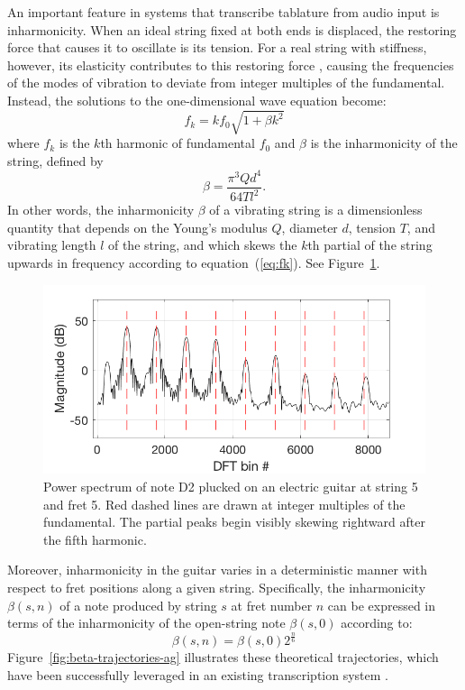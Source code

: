 \documentclass[convention,peer-reviewed]{aesconf}
\begin{document}
An important feature in systems that transcribe tablature from audio input is inharmonicity. When an ideal string fixed at both ends is displaced, the restoring force that causes it to oscillate is its tension. For a real string with stiffness, however, its elasticity contributes to this restoring force \citep{fletcher1962}, causing the frequencies of the modes of vibration to deviate from integer multiples of the fundamental. Instead, the solutions to the one-dimensional wave equation become: 
\begin{equation}
\label{eq:fk}
f_k = kf_{0}\sqrt{1+\beta k^2}
\end{equation}
where $f_k$ is the $k$th harmonic of fundamental $f_0$ and $\beta$ is the inharmonicity of the string, defined by
\begin{equation}
\beta = \frac{\pi^3 Q d^4}{64 T l^2}. \label{eq:beta}
\end{equation}
In other words, the inharmonicity $\beta$ of a vibrating string is a dimensionless quantity that depends on the Young's modulus $Q$, diameter $d$, tension $T$, and vibrating length $l$ of the string, and which skews the $k$th partial of the string upwards in frequency according to equation~(\ref{eq:fk}). See Figure~\ref{fig:skew}. 

\begin{figure}[!htbp]
\centering
\includegraphics[scale=0.3]{skew}
\caption{Power spectrum of note D2 plucked on an electric guitar at string 5 and fret 5. Red dashed lines are drawn at integer multiples of the fundamental. The partial peaks begin visibly skewing rightward after the fifth harmonic.}
\label{fig:skew}
\end{figure}

Moreover, inharmonicity in the guitar varies in a deterministic manner with respect to fret positions along a given string. Specifically, the inharmonicity $\beta(s,n)$ of a note produced by string $s$ at fret number $n$ can be expressed in terms of the inharmonicity of the open-string note $\beta(s,0)$ according to:
\begin{equation} 
\label{eq:beta-traj}
\beta(s,n) = \beta(s,0)2^{\frac{n}{6}}
\end{equation}
Figure~\ref{fig:beta-trajectories-ag} illustrates these theoretical trajectories, which have been successfully leveraged in an existing transcription system \citep{barbanchoi2012}.
\end{document}
